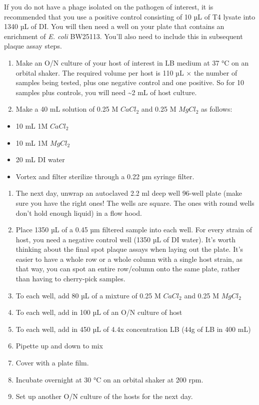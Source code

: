 \documentclass[
]{book}
\providecommand{\tightlist}{%
  \setlength{\itemsep}{0pt}\setlength{\parskip}{0pt}}
\begin{document}
If you do not have a phage isolated on the pathogen of interest, it is recommended that you use a positive control consisting of 10 µL of T4 lysate into 1340 µL of DI. You will then need a well on your plate that contains an enrichment of \emph{E. coli} BW25113. You'll also need to include this in subsequent plaque assay steps.

\begin{enumerate}
\def\labelenumi{\arabic{enumi}.}
\tightlist
\item
  Make an O/N culture of your host of interest in LB medium at 37 °C on an orbital shaker. The required volume per host is 110 µL \(\times\) the number of samples being tested, plus one negative control and one positive. So for 10 samples plus controls, you will need \textasciitilde2 mL of host culture.
\item
  Make a 40 mL solution of 0.25 M \(CaCl_2\) and 0.25 M \(MgCl_2\) as follows:
\end{enumerate}

\begin{itemize}
\tightlist
\item
  10 mL 1M \(CaCl_2\)
\item
  10 mL 1M \(MgCl_2\)
\item
  20 mL DI water
\item
  Vortex and filter sterilize through a 0.22 µm syringe filter.
\end{itemize}

\begin{enumerate}
\def\labelenumi{\arabic{enumi}.}
\setcounter{enumi}{2}
\tightlist
\item
  The next day, unwrap an autoclaved 2.2 ml deep well 96-well plate (make sure you have the right ones! The wells are square. The ones with round wells don't hold enough liquid) in a flow hood.
\item
  Place 1350 µL of a 0.45 µm filtered sample into each well. For every strain of host, you need a negative control well (1350 µL of DI water). It's worth thinking about the final spot plaque assays when laying out the plate. It's easier to have a whole row or a whole column with a single host strain, as that way, you can spot an entire row/column onto the same plate, rather than having to cherry-pick samples.
\item
  To each well, add 80 µL of a mixture of 0.25 M \(CaCl_2\) and 0.25 M \(MgCl_2\)
\item
  To each well, add in 100 µL of an O/N culture of host
\item
  To each well, add in 450 µL of 4.4x concentration LB (44g of LB in 400 mL)
\item
  Pipette up and down to mix
\item
  Cover with a plate film.
\item
  Incubate overnight at 30 °C on an orbital shaker at 200 rpm.
\item
  Set up another O/N culture of the hosts for the next day.
\end{enumerate}
\end{document}
